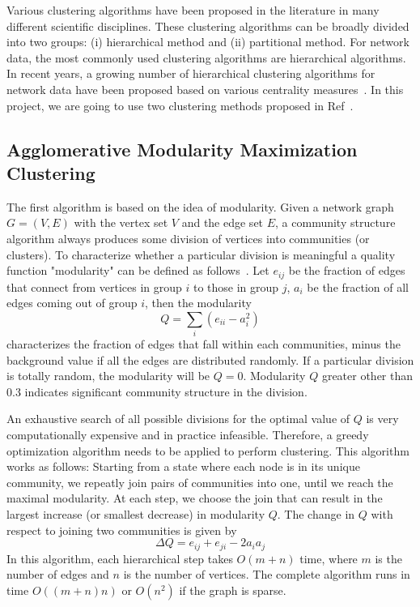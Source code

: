 \documentclass{article} %
\begin{document}
Various clustering algorithms have been proposed in the literature in many different scientific disciplines. These clustering algorithms can be broadly divided into two groups: (i) hierarchical method and (ii) partitional method. For network data, the most commonly used clustering algorithms are hierarchical algorithms. In recent years, a growing number of hierarchical clustering algorithms for network data have been proposed based on various centrality measures~\cite{method_review}. In this project, we are going to use two clustering methods proposed in Ref~\cite{bottom_up, new_method}. 

\subsection{Agglomerative Modularity Maximization Clustering} 

The first algorithm is based on the idea of modularity. Given a network graph $G = (V, E)$ with the vertex set $V$ and the edge set $E$, a community structure algorithm always produces some division of vertices into communities (or clusters). To characterize whether a particular division is meaningful a quality function "modularity" can be defined as follows~\cite{Newman_algorithm}. Let $e_{ij}$ be the fraction of edges that connect from vertices in group $i$ to those in group $j$, $a_i$ be the fraction of all edges coming out of group $i$, then the modularity
\begin{equation}
Q = \sum_i (e_{ii} - a_i^2)
\end{equation}
characterizes the fraction of edges that fall within each communities, minus the background value if all the edges are distributed randomly. If a particular division is totally random, the modularity will be $Q=0$. Modularity $Q$ greater other than 0.3 indicates significant community structure in the division.

An exhaustive search of all possible divisions for the optimal value of $Q$ is very computationally expensive and in practice infeasible. Therefore, a greedy optimization algorithm needs to be applied to perform clustering. This algorithm works as follows: Starting from a state where each node is in its unique community, we repeatly join pairs of communities into one, until we reach the maximal modularity. At each step, we choose the join that can result in the largest increase (or smallest decrease) in modularity $Q$. The change in $Q$ with respect to joining two communities is given by
\begin{equation}
\Delta Q = e_{ij} + e_{ji} - 2 a_i a_j
\end{equation}
In this algorithm, each hierarchical step takes $O(m+n)$ time, where $m$ is the number of edges and $n$ is the number of vertices. The complete algorithm runs in time $O((m+n)n)$ or $O(n^2)$ if the graph is sparse.
\end{document}
